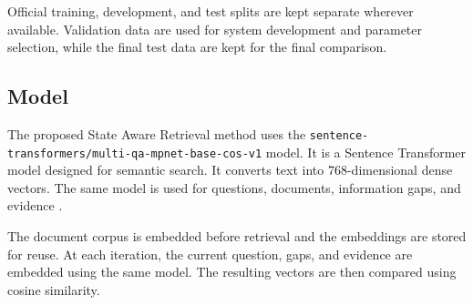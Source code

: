 \documentclass[12pt,a4paper]{report}
\begin{document}
Official training, development, and test splits are kept separate wherever available. Validation data are used for system development and parameter selection, while the final test data are kept for the final comparison.

\subsection{Model}

The proposed State Aware Retrieval method uses the
\texttt{sentence-transformers/multi-qa-mpnet-base-cos-v1} model.
It is a Sentence Transformer model designed for semantic search. It
converts text into 768-dimensional dense vectors. The same model is
used for questions, documents, information gaps, and evidence
\cite{reimers2019sentence,st2020mpnet}.

The document corpus is embedded before retrieval and the embeddings are
stored for reuse. At each iteration, the current question, gaps, and
evidence are embedded using the same model. The resulting vectors are
then compared using cosine similarity.
\end{document}
